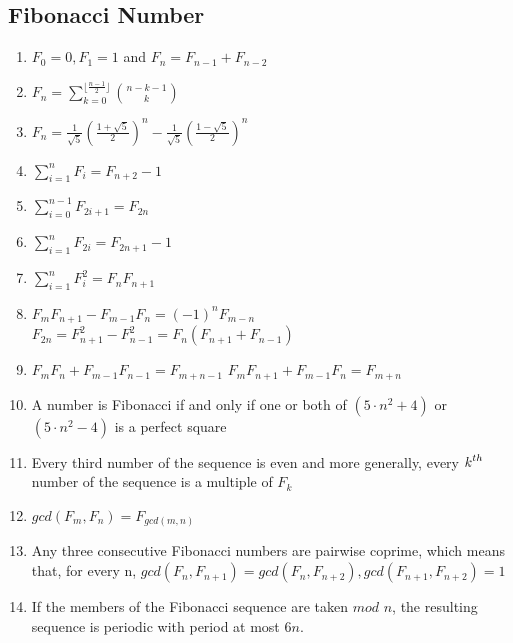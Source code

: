 \subsection{Fibonacci Number}
\begin{enumerate}
\item $\displaystyle F_0=0, F_1=1$ and $\displaystyle F_n=F_{n-1}+F_{n-2}$
\item $\displaystyle F_n=\sum\limits_{k=0}^{\lfloor\frac{n-1}{2}\rfloor}\binom{n-k-1}{k}$
\item $\displaystyle F_n=\frac{1}{\sqrt{5}}(\frac{1+\sqrt{5}}{2})^n-\frac{1}{\sqrt{5}}(\frac{1-\sqrt{5}}{2})^n$
\item $\displaystyle \sum\limits_{i=1}^{n}F_i=F_{n+2}-1$
\item $\displaystyle \sum\limits_{i=0}^{n-1}F_{2i+1}=F_{2n}$
\item $\displaystyle \sum\limits_{i=1}^{n}F_{2i}=F_{2n+1}-1$
\item $\displaystyle \sum\limits_{i=1}^{n}F_{i}^{2}=F_nF_{n+1}$
\item $\displaystyle F_mF_{n+1}-F_{m-1}F_{n}=(-1)^nF_{m-n}$  
    $\displaystyle F_{2n}=F_{n+1}^2-F_{n-1}^2=F_n(F_{n+1}+F_{n-1})$
\item $\displaystyle F_mF_n+F_{m-1}F_{n-1}=F_{m+n-1}$  
    $\displaystyle F_mF_{n+1}+F_{m-1}F_{n}=F_{m+n}$
\item A number is Fibonacci if and only if one or both of $\displaystyle (5 \cdot n^2 + 4)$ or $\displaystyle (5 \cdot n^2 - 4)$ is a perfect square
\item Every third number of the sequence is even and more generally, every $\displaystyle \displaystyle k^{th}$ number of the sequence is a multiple of $\displaystyle F_k$
\item $gcd(F_m, F_n)=F_{gcd(m, n)}$
\item Any three consecutive Fibonacci numbers are pairwise coprime, which means that, for every n, $gcd(F_n, F_{n+1})=gcd(F_n, F_{n+2}), gcd(F_{n+1}, F_{n+2})=1$
\item If the members of the Fibonacci sequence are taken $mod$ $n$, the resulting sequence is periodic with period at most $6n$.
\end{enumerate}


